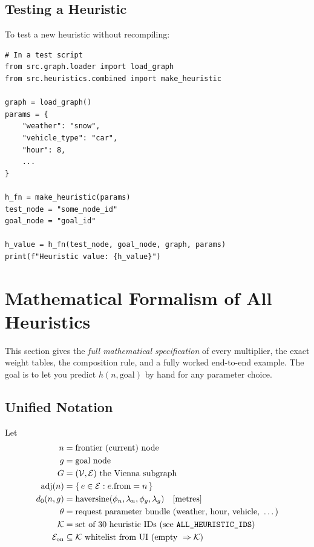 \documentclass[12pt,a4paper]{article}
\begin{document}
\subsection{Testing a Heuristic}

To test a new heuristic without recompiling:

\begin{lstlisting}
# In a test script
from src.graph.loader import load_graph
from src.heuristics.combined import make_heuristic

graph = load_graph()
params = {
    "weather": "snow",
    "vehicle_type": "car",
    "hour": 8,
    ...
}

h_fn = make_heuristic(params)
test_node = "some_node_id"
goal_node = "goal_id"

h_value = h_fn(test_node, goal_node, graph, params)
print(f"Heuristic value: {h_value}")
\end{lstlisting}

\newpage

\section{Mathematical Formalism of All Heuristics}
\label{sec:math}

This section gives the \emph{full mathematical specification} of every multiplier, the exact weight tables, the composition rule, and a fully worked end-to-end example. The goal is to let you predict $h(n,\text{goal})$ by hand for any parameter choice.

\subsection{Unified Notation}

Let
\begin{align*}
  n         &= \text{frontier (current) node} \\
  g         &= \text{goal node} \\
  G         &= (\mathcal{V}, \mathcal{E}) \text{ the Vienna subgraph} \\
  \mathrm{adj}(n) &= \{\, e \in \mathcal{E} : e.\text{from} = n \,\} \\
  d_0(n,g)  &= \text{haversine}(\phi_n, \lambda_n, \phi_g, \lambda_g) \quad [\text{metres}] \\
  \theta    &= \text{request parameter bundle (weather, hour, vehicle, } \ldots\text{)} \\
  \mathcal{K} &= \text{set of } 30 \text{ heuristic IDs (see \texttt{ALL\_HEURISTIC\_IDS})} \\
  \mathcal{E}_{\text{on}} &\subseteq \mathcal{K} \text{ whitelist from UI (empty } \Rightarrow \mathcal{K}\text{)}
\end{align*}
\end{document}
